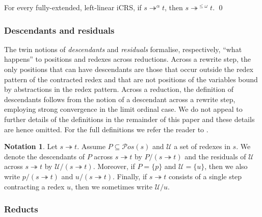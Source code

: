 \documentclass{LMCS}
\theoremstyle{plain}
\theoremstyle{definition}
\newtheorem{notation}[thm]{Notation}
\newcommand{\trewt}{\twoheadrightarrow}
\newcommand{\trewtp}[1]{\twoheadrightarrow^{#1}}
\newcommand{\pos}[1]{\mathcal{P}os(#1)}
\begin{document}
\begin{thm}[Compression]
\label{the:compression}
For every fully-extended, left-linear iCRS, if $s \trewtp{\alpha} t$, then $s \trewtp{\leq \omega} t$. \qed
\end{thm}

\subsubsection{Descendants and residuals}

The twin notions of \emph{descendants} and \emph{residuals} formalise, respectively, ``what happens'' to positions and redexes across reductions. Across a rewrite step, the only positions that can have descendants are those that occur outside the redex pattern of the contracted redex and that are not positions of the variables bound by abstractions in the redex pattern. Across a reduction, the definition of descendants follows from the notion of a descendant across a rewrite step, employing strong convergence in the limit ordinal case. We do not appeal to further details of the definitions in the remainder of this paper and these details are hence omitted. For the full definitions we refer the reader to \cite{JJ05a}.

\begin{notation}
Let $s \trewt t$. Assume $P \subseteq \pos{s}$ and $\mathcal{U}$ a set of redexes in $s$. We denote the descendants of $P$ across $s \trewt t$ by $P/(s \trewt t)$ and the residuals of $\mathcal{U}$ across $s \trewt t$ by $\mathcal{U}/(s \trewt t)$. Moreover, if $P = \{ p \}$ and $\mathcal{U} = \{ u \}$, then we also write $p/(s \trewt t)$ and $u/(s \trewt t)$. Finally, if $s \trewt t$ consists of a single step contracting a redex $u$, then we sometimes write $\mathcal{U}/u$.
\end{notation}

\subsubsection{Reducts}
\end{document}
